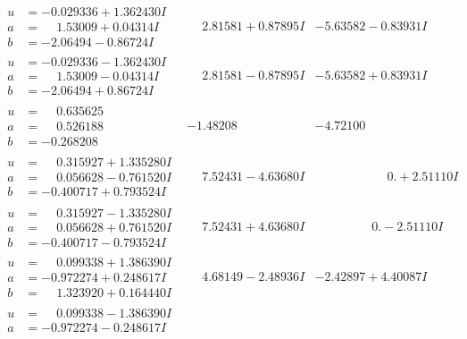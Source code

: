 \documentclass[1p]{elsarticle_modified}
\theoremstyle{definition}
\begin{document}
$$\begin{array}{c|c|c}
\begin{aligned}
u &= -0.029336 + 1.362430 I \\
a &= \phantom{-}1.53009 + 0.04314 I \\
b &= -2.06494 - 0.86724 I\end{aligned}
 & \phantom{-}2.81581 + 0.87895 I & -5.63582 - 0.83931 I \\ \hline\begin{aligned}
u &= -0.029336 - 1.362430 I \\
a &= \phantom{-}1.53009 - 0.04314 I \\
b &= -2.06494 + 0.86724 I\end{aligned}
 & \phantom{-}2.81581 - 0.87895 I & -5.63582 + 0.83931 I \\ \hline\begin{aligned}
u &= \phantom{-}0.635625\phantom{ +0.000000I} \\
a &= \phantom{-}0.526188\phantom{ +0.000000I} \\
b &= -0.268208\phantom{ +0.000000I}\end{aligned}
 & -1.48208\phantom{ +0.000000I} & -4.72100\phantom{ +0.000000I} \\ \hline\begin{aligned}
u &= \phantom{-}0.315927 + 1.335280 I \\
a &= \phantom{-}0.056628 - 0.761520 I \\
b &= -0.400717 + 0.793524 I\end{aligned}
 & \phantom{-}7.52431 - 4.63680 I & \phantom{-0.000000 -}0. + 2.51110 I \\ \hline\begin{aligned}
u &= \phantom{-}0.315927 - 1.335280 I \\
a &= \phantom{-}0.056628 + 0.761520 I \\
b &= -0.400717 - 0.793524 I\end{aligned}
 & \phantom{-}7.52431 + 4.63680 I & \phantom{-0.000000 } 0. - 2.51110 I \\ \hline\begin{aligned}
u &= \phantom{-}0.099338 + 1.386390 I \\
a &= -0.972274 + 0.248617 I \\
b &= \phantom{-}1.323920 + 0.164440 I\end{aligned}
 & \phantom{-}4.68149 - 2.48936 I & -2.42897 + 4.40087 I \\ \hline\begin{aligned}
u &= \phantom{-}0.099338 - 1.386390 I \\
a &= -0.972274 - 0.248617 I \\

\end{aligned}
\end{array}$$
\end{document}
